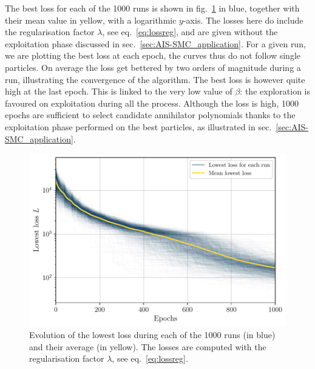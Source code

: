 \documentclass[11pt,a4paper]{article}
\begin{document}
	The best loss for each of the 1000 runs is shown in fig.~\ref{fig:lossallASMC} in blue, together with their mean value in yellow, with a logarithmic $y$-axis. The losses here do include the regularisation factor $\lambda$, see eq.~\eqref{eq:lossreg}, and are given without the exploitation phase discussed in sec.~\ref{sec:AIS-SMC_application}. For a given run, we are plotting the best loss at each epoch, the curves thus do not follow single particles. On average the loss get bettered by two orders of magnitude during a run, illustrating the convergence of the algorithm. The best loss is however quite high at the last epoch. This is linked to the very low value of $\beta$: the exploration is favoured on exploitation during all the process. Although the loss is high, 1000 epochs are sufficient to select candidate annihilator polynomials thanks to the exploitation phase performed on the best particles, as illustrated in sec.~\ref{sec:AIS-SMC_application}.

	\begin{figure}
		\centering
		\includegraphics[scale=0.75]{Figures/Loss_all_ASMC_1000runs_13.pdf}
		\caption{Evolution of the lowest loss during each of the 1000 runs (in blue) and their average (in yellow). The losses are computed with the regularisation factor $\lambda$, see eq.~\eqref{eq:lossreg}.}
		\label{fig:lossallASMC}
	\end{figure}


\end{document}
